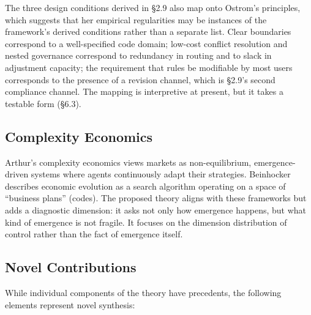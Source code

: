 \documentclass[11pt,a4paper]{article}
\begin{document}
The three design conditions derived in \S2.9 also map onto Ostrom's principles, which suggests that her empirical regularities may be instances of the framework's derived conditions rather than a separate list. Clear boundaries correspond to a well-specified code domain; low-cost conflict resolution and nested governance correspond to redundancy in routing and to slack in adjustment capacity; the requirement that rules be modifiable by most users corresponds to the presence of a revision channel, which is \S2.9's second compliance channel. The mapping is interpretive at present, but it takes a testable form (\S6.3).

\subsection{Complexity Economics}

Arthur's complexity economics \citep{arthur2013, arthur2021} views markets as non-equilibrium, emergence-driven systems where agents continuously adapt their strategies. Beinhocker \citep{beinhocker2006} describes economic evolution as a search algorithm operating on a space of ``business plans'' (codes). The proposed theory aligns with these frameworks but adds a diagnostic dimension: it asks not only how emergence happens, but what kind of emergence is not fragile. It focuses on the dimension distribution of control rather than the fact of emergence itself.

\subsection{Novel Contributions}

While individual components of the theory have precedents, the following elements represent novel synthesis:
\end{document}
